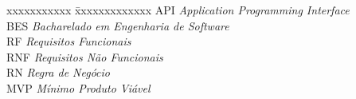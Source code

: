 \ifx\isenglish\undefined
{}
\else
{}
\fi


\begin{tabbing}
xxxxxxxxxxx \= xxxxxxxxxxxxx \kill
\textsc{API}            \> \textit{Application Programming Interface}\\

\textsc{BES}            \> \textit{Bacharelado em Engenharia de Software}\\

\textsc{RF}             \> \textit{Requisitos Funcionais}\\

\textsc{RNF}            \> \textit{Requisitos Não Funcionais}\\

\textsc{RN}            \> \textit{Regra de Negócio}\\

\textsc{MVP}            \> \textit{Mínimo Produto Viável}


\end{tabbing}

